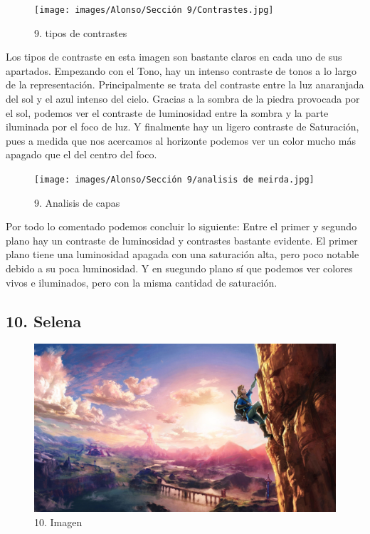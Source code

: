 \documentclass[12pt]{article}
\begin{document}
\begin{figure}[H]
      \centering
      \texttt{[image: images/Alonso/Sección 9/Contrastes.jpg]}
      \caption{\small 9. tipos de contrastes}
    \end{figure}
    Los tipos de contraste en esta imagen son bastante claros en cada uno de sus apartados. Empezando con el Tono, hay un intenso contraste de tonos a lo largo de la representación. Principalmente se trata del contraste entre la luz anaranjada del sol y el azul intenso del cielo. Gracias a la sombra de la piedra provocada por el sol, podemos ver el contraste de luminosidad entre la sombra y la parte iluminada por el foco de luz. Y finalmente hay un ligero contraste de Saturación, pues a medida que nos acercamos al horizonte podemos ver un color mucho más apagado que el del centro del foco.

    \begin{figure}[H]
      \centering
      \texttt{[image: images/Alonso/Sección 9/analisis de meirda.jpg]}
      \caption{\small 9. Analisis de capas}
    \end{figure}

    Por todo lo comentado podemos concluir lo siguiente: Entre el primer y segundo plano hay un contraste de luminosidad y contrastes bastante evidente. El primer plano tiene una luminosidad apagada con una saturación alta, pero poco notable debido a su poca luminosidad. Y en suegundo plano sí que podemos ver colores vivos e iluminados, pero con la misma cantidad de saturación.


        \newpage


\subsection{10. Selena}
    \begin{figure}[H]
      \centering
      \includegraphics[width=\textwidth]{images/Selena/10_concept_art.jpg}
      \caption{\small 10. Imagen}
    \end{figure}
\end{document}

